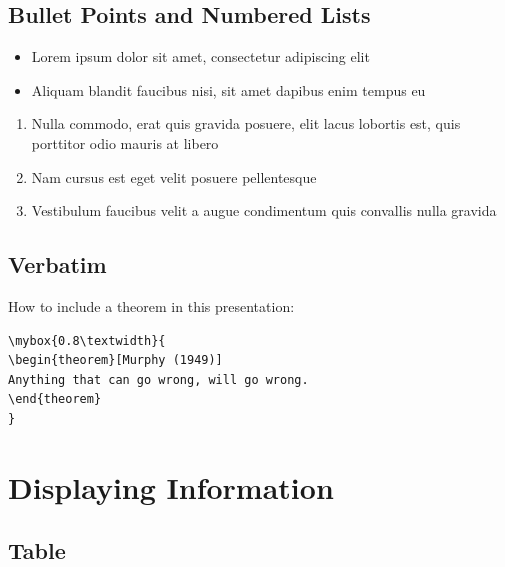 \documentclass[
paper=128mm:96mm, %
fontsize=11pt, %
pagesize, %
parskip=half-, %
]{scrartcl} %
\theoremstyle{mythmstyle} %
\newtheorem{theorem}{Theorem}[section] %
\newcommand*{\mybox}[2]{ %
\par\noindent
\begin{tikzpicture}[mynodestyle/.style={rectangle,draw=mygreen,thick,inner sep=2mm,text justified,top color=white,bottom color=white,above}]\node[mynodestyle,at={(0.5*#1+2mm+0.4pt,0)}]{ %
\begin{minipage}[t]{#1}
#2
\end{minipage}
};
\end{tikzpicture}
\par\vspace{-1.3em}}
\begin{document}
\clearpage


\subsection{Bullet Points and Numbered Lists}

\begin{itemize}
\item Lorem ipsum dolor sit amet, consectetur adipiscing elit
\item Aliquam blandit faucibus nisi, sit amet dapibus enim tempus eu
\end{itemize}

\begin{enumerate}
\item Nulla commodo, erat quis gravida posuere, elit lacus lobortis est, quis porttitor odio mauris at libero
\item Nam cursus est eget velit posuere pellentesque
\item Vestibulum faucibus velit a augue condimentum quis convallis nulla gravida
\end{enumerate}

\clearpage


\subsection{Verbatim}

How to include a theorem in this presentation:
\begin{verbatim}
\mybox{0.8\textwidth}{
\begin{theorem}[Murphy (1949)]
Anything that can go wrong, will go wrong.
\end{theorem}
}
\end{verbatim}

\clearpage



\section{Displaying Information}

\clearpage


\subsection{Table}
\end{document}

